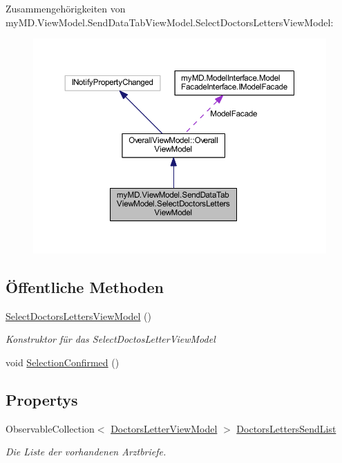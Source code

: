 Zusammengehörigkeiten von my\+M\+D.\+View\+Model.\+Send\+Data\+Tab\+View\+Model.\+Select\+Doctors\+Letters\+View\+Model\+:\nopagebreak
\begin{figure}[H]
\begin{center}
\leavevmode
\includegraphics[width=350pt]{classmy_m_d_1_1_view_model_1_1_send_data_tab_view_model_1_1_select_doctors_letters_view_model__coll__graph}
\end{center}
\end{figure}
\subsection*{Öffentliche Methoden}
\begin{DoxyCompactItemize}
\item 
\mbox{\hyperlink{classmy_m_d_1_1_view_model_1_1_send_data_tab_view_model_1_1_select_doctors_letters_view_model_a87c5e4323853a8ec4a634b011d26ae97}{Select\+Doctors\+Letters\+View\+Model}} ()
\begin{DoxyCompactList}\small\item\em Konstruktor für das Select\+Doctos\+Letter\+View\+Model \end{DoxyCompactList}\item 
void \mbox{\hyperlink{classmy_m_d_1_1_view_model_1_1_send_data_tab_view_model_1_1_select_doctors_letters_view_model_afcbd35ecf142d8dfcaa307ab79344c92}{Selection\+Confirmed}} ()
\end{DoxyCompactItemize}
\subsection*{Propertys}
\begin{DoxyCompactItemize}
\item 
Observable\+Collection$<$ \mbox{\hyperlink{classmy_m_d_1_1_view_model_1_1_overview_tab_view_model_1_1_doctors_letter_view_model}{Doctors\+Letter\+View\+Model}} $>$ \mbox{\hyperlink{classmy_m_d_1_1_view_model_1_1_send_data_tab_view_model_1_1_select_doctors_letters_view_model_aedf4441145d130f6902a509a97b3a7d8}{Doctors\+Letters\+Send\+List}}
\begin{DoxyCompactList}\small\item\em Die Liste der vorhandenen Arztbriefe. \end{DoxyCompactList}\end{DoxyCompactItemize}
